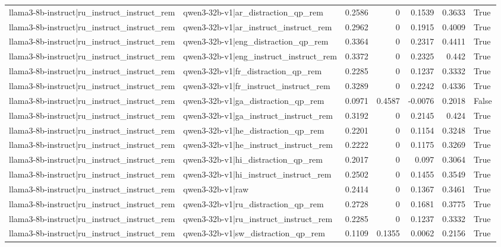 \begin{table}
\begin{tabular}{l l r r r r l}
llama3-8b-instruct|ru_instruct_instruct_rem & qwen3-32b-v1|ar_distraction_qp_rem & 0.2586 & 0 & 0.1539 & 0.3633 & True \\
llama3-8b-instruct|ru_instruct_instruct_rem & qwen3-32b-v1|ar_instruct_instruct_rem & 0.2962 & 0 & 0.1915 & 0.4009 & True \\
llama3-8b-instruct|ru_instruct_instruct_rem & qwen3-32b-v1|eng_distraction_qp_rem & 0.3364 & 0 & 0.2317 & 0.4411 & True \\
llama3-8b-instruct|ru_instruct_instruct_rem & qwen3-32b-v1|eng_instruct_instruct_rem & 0.3372 & 0 & 0.2325 & 0.442 & True \\
llama3-8b-instruct|ru_instruct_instruct_rem & qwen3-32b-v1|fr_distraction_qp_rem & 0.2285 & 0 & 0.1237 & 0.3332 & True \\
llama3-8b-instruct|ru_instruct_instruct_rem & qwen3-32b-v1|fr_instruct_instruct_rem & 0.3289 & 0 & 0.2242 & 0.4336 & True \\
llama3-8b-instruct|ru_instruct_instruct_rem & qwen3-32b-v1|ga_distraction_qp_rem & 0.0971 & 0.4587 & -0.0076 & 0.2018 & False \\
llama3-8b-instruct|ru_instruct_instruct_rem & qwen3-32b-v1|ga_instruct_instruct_rem & 0.3192 & 0 & 0.2145 & 0.424 & True \\
llama3-8b-instruct|ru_instruct_instruct_rem & qwen3-32b-v1|he_distraction_qp_rem & 0.2201 & 0 & 0.1154 & 0.3248 & True \\
llama3-8b-instruct|ru_instruct_instruct_rem & qwen3-32b-v1|he_instruct_instruct_rem & 0.2222 & 0 & 0.1175 & 0.3269 & True \\
llama3-8b-instruct|ru_instruct_instruct_rem & qwen3-32b-v1|hi_distraction_qp_rem & 0.2017 & 0 & 0.097 & 0.3064 & True \\
llama3-8b-instruct|ru_instruct_instruct_rem & qwen3-32b-v1|hi_instruct_instruct_rem & 0.2502 & 0 & 0.1455 & 0.3549 & True \\
llama3-8b-instruct|ru_instruct_instruct_rem & qwen3-32b-v1|raw & 0.2414 & 0 & 0.1367 & 0.3461 & True \\
llama3-8b-instruct|ru_instruct_instruct_rem & qwen3-32b-v1|ru_distraction_qp_rem & 0.2728 & 0 & 0.1681 & 0.3775 & True \\
llama3-8b-instruct|ru_instruct_instruct_rem & qwen3-32b-v1|ru_instruct_instruct_rem & 0.2285 & 0 & 0.1237 & 0.3332 & True \\
llama3-8b-instruct|ru_instruct_instruct_rem & qwen3-32b-v1|sw_distraction_qp_rem & 0.1109 & 0.1355 & 0.0062 & 0.2156 & True \\

\end{tabular}
\end{table}
